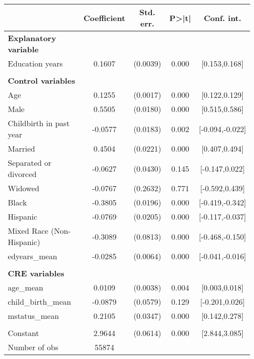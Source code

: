 {
\def\sym#1{\ifmmode^{#1}\else\(^{#1}\)\fi}
\begin{tabular}{l*{1}{cccc}}
\toprule
                    & Coefficient&   Std. err.&       P>|t|&  Conf. int.\\
\midrule
\textbf{Explanatory variable}&            &            &            &            \\
Education years     &      0.1607&    (0.0039)&       0.000&[0.153,0.168]\\
\\ \textbf{Control variables}&            &            &            &            \\
Age                 &      0.1255&    (0.0017)&       0.000&[0.122,0.129]\\
Male                &      0.5505&    (0.0180)&       0.000&[0.515,0.586]\\
Childbirth in past year&     -0.0577&    (0.0183)&       0.002&[-0.094,-0.022]\\
Married             &      0.4504&    (0.0221)&       0.000&[0.407,0.494]\\
Separated or divorced&     -0.0627&    (0.0430)&       0.145&[-0.147,0.022]\\
Widowed             &     -0.0767&    (0.2632)&       0.771&[-0.592,0.439]\\
Black               &     -0.3805&    (0.0196)&       0.000&[-0.419,-0.342]\\
Hispanic            &     -0.0769&    (0.0205)&       0.000&[-0.117,-0.037]\\
Mixed Race (Non-Hispanic)&     -0.3089&    (0.0813)&       0.000&[-0.468,-0.150]\\
edyears\_mean        &     -0.0285&    (0.0064)&       0.000&[-0.041,-0.016]\\
\\ \textbf{CRE variables}&            &            &            &            \\
age\_mean            &      0.0109&    (0.0038)&       0.004&[0.003,0.018]\\
child\_birth\_mean    &     -0.0879&    (0.0579)&       0.129&[-0.201,0.026]\\
mstatus\_mean        &      0.2105&    (0.0347)&       0.000&[0.142,0.278]\\
                    &            &            &            &            \\
Constant            &      2.9644&    (0.0614)&       0.000&[2.844,3.085]\\
\midrule
Number of obs       &       55874&            &            &            \\

\end{tabular}}
